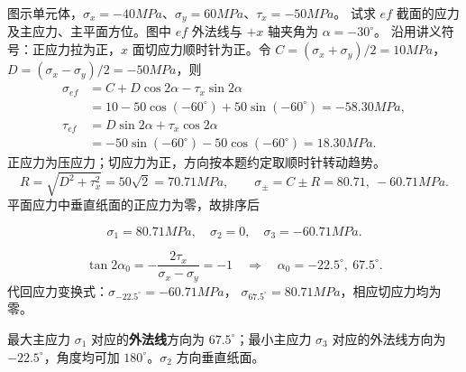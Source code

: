 \documentclass[a4paper,10pt,fontset=none]{ctexart}
\begin{document}
图示单元体，$\sigma_x=-40\unit{MPa}$、$\sigma_y=60\unit{MPa}$、$\tau_x=-50\unit{MPa}$。
试求 $ef$ 截面的应力及主应力、主平面方位。图中 $ef$ 外法线与 $+x$ 轴夹角为 $\alpha=-30^\circ$。
沿用讲义符号：正应力拉为正，$x$ 面切应力顺时针为正。令
$C=(\sigma_x+\sigma_y)/2=10\unit{MPa}$，$D=(\sigma_x-\sigma_y)/2=-50\unit{MPa}$，则
\[
\begin{aligned}
\sigma_{ef}&=C+D\cos2\alpha-\tau_x\sin2\alpha\\
&=10-50\cos(-60^\circ)+50\sin(-60^\circ)=-58.30\unit{MPa},\\
\tau_{ef}&=D\sin2\alpha+\tau_x\cos2\alpha\\
&=-50\sin(-60^\circ)-50\cos(-60^\circ)=18.30\unit{MPa}.
\end{aligned}
\]
正应力为压应力；切应力为正，方向按本题约定取顺时针转动趋势。
\[
R=\sqrt{D^2+\tau_x^2}=50\sqrt2=70.71\unit{MPa},\qquad
\sigma_\pm=C\pm R=80.71,\ -60.71\unit{MPa}.
\]
平面应力中垂直纸面的正应力为零，故排序后
\begin{answerbox}
\[
\boxed{\sigma_1=80.71\unit{MPa},\quad \sigma_2=0,\quad \sigma_3=-60.71\unit{MPa}}.
\]
\end{answerbox}
\[
\tan2\alpha_0=-\frac{2\tau_x}{\sigma_x-\sigma_y}=-1
\quad\Longrightarrow\quad\alpha_0=-22.5^\circ,\ 67.5^\circ.
\]
代回应力变换式：$\sigma_{-22.5^\circ}=-60.71\unit{MPa}$，
$\sigma_{67.5^\circ}=80.71\unit{MPa}$，相应切应力均为零。
\begin{answerbox}
最大主应力 $\sigma_1$ 对应的\textbf{外法线}方向为 $67.5^\circ$；最小主应力 $\sigma_3$ 对应的外法线方向为 $-22.5^\circ$，角度均可加 $180^\circ$。$\sigma_2$ 方向垂直纸面。
\end{answerbox}
\end{document}
